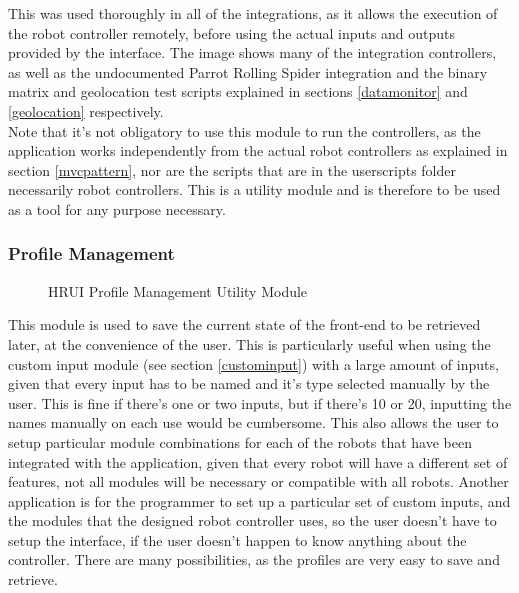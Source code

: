 This was used thoroughly in all of the integrations, as it allows the execution of the robot controller remotely, before 
using 
the actual inputs and outputs provided by the interface. The image shows many of the integration controllers, as well as the 
undocumented Parrot Rolling Spider integration and the binary matrix and geolocation test scripts explained in sections 
\ref{datamonitor} and \ref{geolocation} respectively.\\

Note that it's not obligatory to use this module to run the controllers, as the application works independently from the 
actual robot controllers as explained in section \ref{mvcpattern}, nor are the scripts that are in the userscripts folder 
necessarily robot controllers. This is a utility module and is therefore to be used as a tool for any purpose necessary.
\subsubsection{Profile Management} \label{profilemanagement}
\begin{figure}[H]
\centering
\captionsetup{justification=centering}
\caption{HRUI Profile Management Utility Module}
\end{figure}
This module is used to save the current state of the front-end to be retrieved later, at the convenience of the user. This is 
particularly useful when using the custom input module (see section \ref{custominput}) with a large amount of inputs, given 
that every input has to be named and it's type selected manually by the user. This is fine if there's one or two inputs, but 
if there's 10 or 20, inputting the names manually on each use would be cumbersome. This also allows the user to setup 
particular module combinations for each of the robots that have been integrated with the application, given that every robot 
will have a different set of features, not all modules will be necessary or compatible with all robots. Another application is
for the programmer to set up a particular set of custom inputs, and the modules that the designed robot controller uses, so 
the user doesn't have to setup the interface, if the user doesn't happen to know anything about the controller. There are 
many possibilities, as the profiles are very easy to save and retrieve.\\

